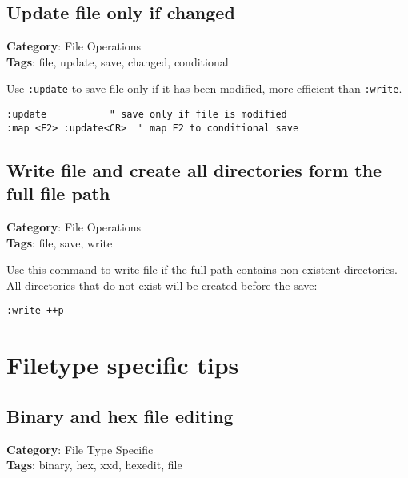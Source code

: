 {{{{{\section{Update file only if changed}

\textbf{Category}: File Operations\\ \textbf{Tags}: file, update, save, changed, conditional
\vspace{0.5cm}

Use {\footnotesize \Verb§:update§} to save file only if it has been modified, more efficient than {\footnotesize \Verb§:write§}.

\begin{Exa*}{}
\begin{Verbatim}[fontsize=\footnotesize, breaklines, breakanywhere]
:update           " save only if file is modified
:map <F2> :update<CR>  " map F2 to conditional save
\end{Verbatim}
\end{Exa*}

\section{Write file and create all directories form the full file path}

\textbf{Category}: File Operations\\ \textbf{Tags}: file, save, write
\vspace{0.5cm}

Use this command to write file if the full path contains non-existent directories. All directories that do not exist will be created before the save:

\begin{Exa*}{}
\begin{Verbatim}[fontsize=\footnotesize, breaklines, breakanywhere]
:write ++p
\end{Verbatim}
\end{Exa*}

\chapter{Filetype specific tips}
\section{Binary and hex file editing}

\textbf{Category}: File Type Specific\\ \textbf{Tags}: binary, hex, xxd, hexedit, file
\vspace{0.5cm}

}}}}}
